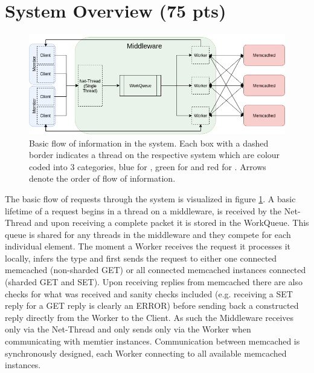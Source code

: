 \section{System Overview (75 pts)\label{sec:1}}

    \begin{figure}
        \includegraphics[width=0.8\linewidth]{graphics/system-request-flow.png}
        \caption{Basic flow of information in the system. Each box with a dashed border indicates a thread on the
                 respective system which are colour coded into 3 categories, blue for \cli, green for \mw{} and red for
                 \srv. Arrows denote the order of flow of information.\label{fig:request-overview}}
    \end{figure}

    The basic flow of requests through the system is visualized in figure \ref{fig:request-overview}. A basic lifetime
    of a request begins in a thread on a middleware, is received by the Net-Thread and upon receiving a complete packet
    it is stored in the WorkQueue. This queue is shared for any threads in the middleware and they compete for each
    individual element. The moment a Worker receives the request it processes it locally, infers the type and first
    sends the request to either one connected memcached (non-sharded GET) or all connected memcached instances connected
    (sharded GET and SET). Upon receiving replies from memcached there are also checks for what was received and sanity
    checks included (e.g. receiving a SET reply for a GET reply is clearly an ERROR) before sending back a constructed
    reply directly from the Worker to the Client. As such the Middleware receives only via the Net-Thread and only sends
    only via the Worker when communicating with memtier instances. Communication between memcached is synchronously
    designed, each Worker connecting to all available memcached instances.


